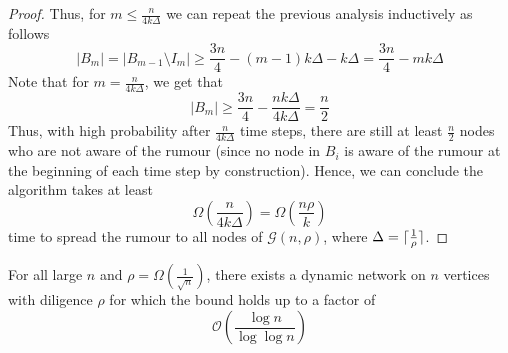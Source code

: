 \begin{proof}
	Thus, for $m \leq \frac{n}{4k\Delta}$ we can repeat the previous analysis inductively as follows %
	$$
		|B_m| = |B_{m-1} \setminus I_m| \geq \frac{3n}{4} - (m-1)k\Delta - k\Delta = \frac{3n}{4} - mk\Delta
	$$
	Note that for $m = \frac{n}{4k\Delta}$, we get that 
	$$
		|B_m| \geq \frac{3n}{4} - \frac{nk\Delta}{4k\Delta} = \frac{n}{2}
	$$
	Thus, with high probability after $\frac{n}{4k\Delta}$ time steps, there are still at least $\frac{n}{2}$ nodes who are not aware of the rumour (since no node in $B_i$ is aware of the rumour at the beginning of each time step by construction). Hence, we can conclude the algorithm takes at least 
	$$
		\Omega\left(\frac{n}{4k\Delta}\right) = \Omega\left(\frac{n\rho}{k}\right)
	$$
	time to spread the rumour to all nodes of $\mathcal{G}(n, \rho)$, where $\Delta = \lceil\frac{1}{\rho}\rceil$.
\end{proof}

\begin{theorem}
	For all large $n$ and $\rho = \Omega\left(\frac{1}{\sqrt{n}}\right)$, there exists a dynamic network on $n$ vertices with diligence $\rho$ for which the bound holds up to a factor of 
	$$
		\mathcal{O}\left(\frac{\log n}{\log \log n}\right)
	$$	
\end{theorem}

